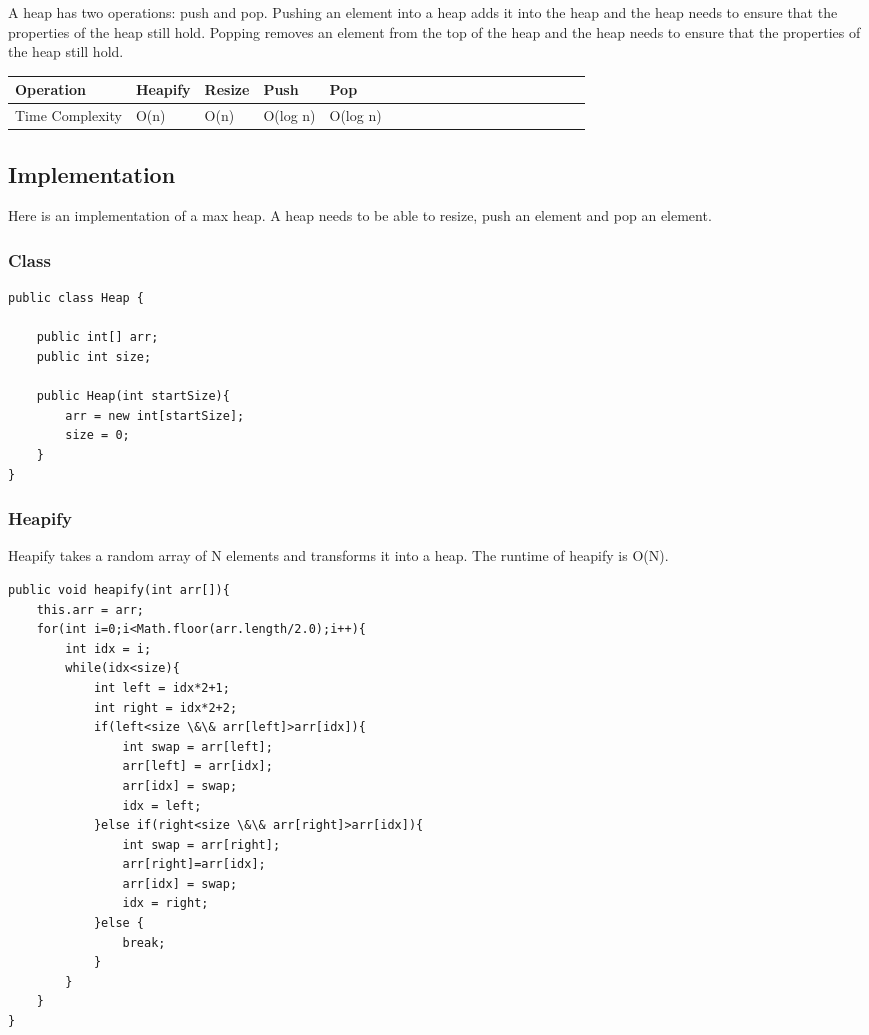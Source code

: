 \documentclass[11pt,oneside]{book}
\begin{document}
A heap has two operations: push and pop. Pushing an element into a heap adds it into the heap and the heap needs to ensure that the properties of the heap still hold. Popping removes an element from the top of the heap and the heap needs to ensure that the properties of the heap still hold.

\vspace{10px}\begin{tabulary}{0.4\linewidth}{|l|l|l|l|l|l|l|l|l|l|l|l|l|l|l|l|l|l|l}\hline


  Operation &
  Heapify &
  Resize &
  Push &
  Pop\\
\hline


  Time Complexity &
  O(n) &
  O(n) &
  O(log n) &
  O(log n)\\

\hline\end{tabulary}

\subsection{Implementation}

Here is an implementation of a max heap. A heap needs to be able to resize, push an element and pop an element.

\subsubsection{Class}

\begin{lstlisting}
public class Heap {

    public int[] arr;
    public int size;
    
    public Heap(int startSize){
        arr = new int[startSize];
        size = 0;
    }
}
\end{lstlisting}

\subsubsection{Heapify}

Heapify takes a random array of N elements and transforms it into a heap. The runtime of heapify is O(N).

\begin{lstlisting}
public void heapify(int arr[]){
    this.arr = arr;
    for(int i=0;i<Math.floor(arr.length/2.0);i++){
        int idx = i;
        while(idx<size){
            int left = idx*2+1;
            int right = idx*2+2;
            if(left<size \&\& arr[left]>arr[idx]){
                int swap = arr[left];
                arr[left] = arr[idx];
                arr[idx] = swap;
                idx = left;
            }else if(right<size \&\& arr[right]>arr[idx]){
                int swap = arr[right];
                arr[right]=arr[idx];
                arr[idx] = swap;
                idx = right;
            }else {
                break;
            }
        }
    }
}
\end{lstlisting}
\end{document}
